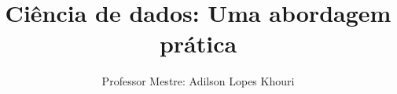 \documentclass[compress, hyperref={pdfpagelayout=SinglePage}]{beamer}
\title[Data Science]{Ciência de dados: Uma abordagem prática}
\author{Professor Mestre: Adilson Lopes Khouri}
\begin{document}
	\begin{frame}
		\titlepage
	\end{frame}
	
	
	
	
	
	
	
	
	
	
	
	
	
	
	
	
	
	
	
	
	
	

	
\end{document}
